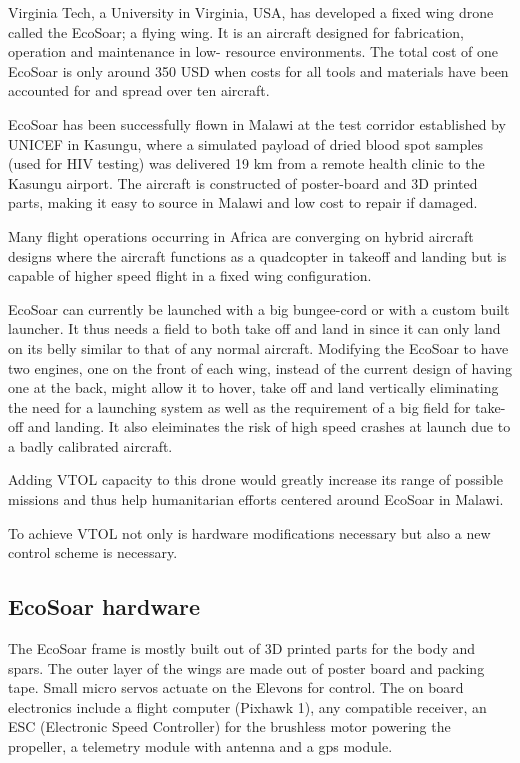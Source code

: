 Virginia Tech, a University in Virginia, USA, has developed a fixed wing drone called the EcoSoar; a flying wing.
It is an aircraft designed for fabrication, operation and maintenance in low-
resource environments.
The total cost of one EcoSoar is only around 350 USD when costs for all tools and materials have been accounted for and spread over ten aircraft.

EcoSoar has been successfully flown in Malawi at the test corridor established by UNICEF in Kasungu, where a simulated payload of dried blood spot samples (used for HIV testing) was delivered 19 km from a remote health clinic to the Kasungu airport.
The aircraft is constructed of poster-board and 3D printed parts, making it easy to source in Malawi and low cost to repair if damaged.

Many flight operations occurring in Africa are converging on hybrid aircraft designs where the aircraft functions as a quadcopter in takeoff and landing but is capable of higher speed flight in a fixed wing configuration.

EcoSoar can currently be launched with a big bungee-cord or with a custom built launcher. It thus needs a field to both take off and land in since it can only land on its belly similar to that of any normal aircraft.
Modifying the EcoSoar to have two engines, one on the front of each wing, instead of the current design of having one at the back, might allow it to hover, take off and land vertically eliminating the need for a launching system as well as the requirement of a big field for take-off and landing.
It also eleiminates the risk of high speed crashes at launch due to a badly calibrated aircraft.

Adding VTOL capacity to this drone would greatly increase its range of possible missions and thus help humanitarian efforts centered around EcoSoar in Malawi.

To achieve VTOL not only is hardware modifications necessary but also a new control scheme is necessary.

\subsection{EcoSoar hardware}
The EcoSoar frame is mostly built out of 3D printed parts for the body and spars.
The outer layer of the wings are made out of poster board and packing tape.
Small micro servos actuate on the Elevons for control.
The on board electronics include a flight computer (Pixhawk 1), any compatible receiver, an ESC (Electronic Speed Controller) for the brushless motor powering the propeller, a telemetry module with antenna and a gps module.